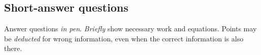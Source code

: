 \renewcommand{\myhead}{\bf Name \hrulefill\hrulefill\ Macid \hrulefill\hrulefill Tutorial section \hrulefill \testver}

\subsection*{Short-answer questions}

{Answer questions \emph{in pen}.  \emph{Briefly} show necessary work and equations. Points may be \emph{deducted} for wrong information, even when the correct information is also there.}

